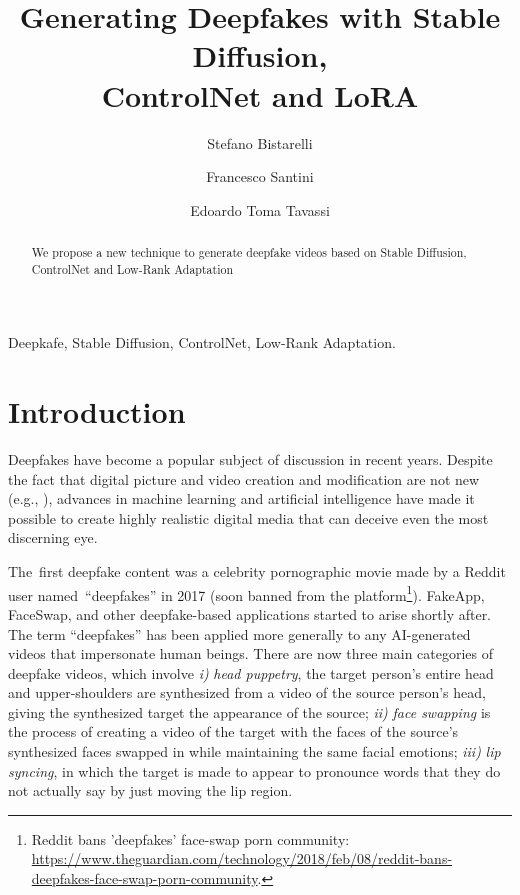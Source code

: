 \documentclass[preprint]{elsarticle}
\begin{document}
\begin{frontmatter}


\title{Generating Deepfakes with Stable Diffusion,\\ ControlNet and LoRA}





\author[perugia]{Stefano Bistarelli}
\author[perugia]{Francesco Santini}
\author[perugia]{Edoardo Toma Tavassi}


\address[perugia]{Dipartimento di Matematica e  Informatica, University of Perugia, Italy}




\begin{abstract} 
We propose a new technique to generate deepfake videos based on Stable Diffusion, ControlNet and Low-Rank Adaptation
\end{abstract}

\begin{keyword}
Deepkafe, Stable Diffusion, ControlNet, Low-Rank Adaptation.
\end{keyword}
\end{frontmatter}



\section{Introduction}


Deepfakes have become a popular subject of discussion in recent years. 
Despite the fact that digital picture and video creation and modification are not new (e.g., \cite{farid}), advances in machine learning and artificial intelligence have made it possible to 
create highly realistic digital media that can deceive even the most discerning eye. 

The first deepfake content was a celebrity pornographic movie made by a Reddit user named ``deepfakes'' in 2017 (soon banned from the platform\footnote{Reddit bans 'deepfakes' face-swap porn community: \url{https://www.theguardian.com/technology/2018/feb/08/reddit-bans-deepfakes-face-swap-porn-community}.}). FakeApp, FaceSwap, and other deepfake-based applications started to arise shortly after. 
The term ``deepfakes'' has been applied more generally to any AI-generated videos that impersonate human beings.
There are now three main categories of deepfake videos, which involve \emph{i)} \emph{head puppetry}, the target person's entire head and upper-shoulders are synthesized from a video of the source person's head, giving the synthesized target the appearance of the source; \emph{ii)} \emph{face swapping} is the process of creating a video of the target with the faces of the source's synthesized faces swapped in while maintaining the same facial emotions; \emph{iii)} \emph{lip syncing}, in which the target is made to appear to pronounce words that they do not actually say by just moving the lip region.
\end{document}
